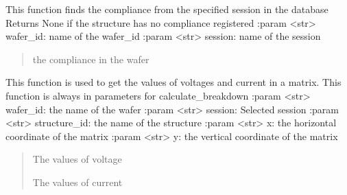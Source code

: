 \documentclass[letterpaper,10pt,english]{sphinxmanual}
\begin{document}
\begin{fulllineitems}
\label{\detokenize{VBD:VBD.get_compliance}}
\pysigstartsignatures
{}
\pysigstopsignatures
\sphinxAtStartPar
This function finds the compliance from the specified session in the database
Returns None if the structure has no compliance registered
:param \textless{}str\textgreater{} wafer\_id: name of the wafer\_id
:param \textless{}str\textgreater{} session: name of the session
\begin{quote}\begin{description}
\sphinxAtStartPar
the compliance in the wafer

\end{description}\end{quote}

\end{fulllineitems}


\begin{fulllineitems}
\label{\detokenize{VBD:VBD.get_vectors_in_matrix}}
\pysigstartsignatures
{}
\pysigstopsignatures
\sphinxAtStartPar
This function is used to get the values of voltages and current in a matrix. This function is always in parameters for calculate\_breakdown
:param \textless{}str\textgreater{} wafer\_id: the name of the wafer
:param \textless{}str\textgreater{} session: Selected session
:param \textless{}str\textgreater{} structure\_id: the name of the structure
:param \textless{}str\textgreater{} x: the horizontal coordinate of the matrix
:param \textless{}str\textgreater{} y: the vertical coordinate of the matrix
\begin{quote}\begin{description}
\sphinxAtStartPar
The values of voltage

\sphinxAtStartPar
The values of current

\end{description}\end{quote}

\end{fulllineitems}
\end{document}
